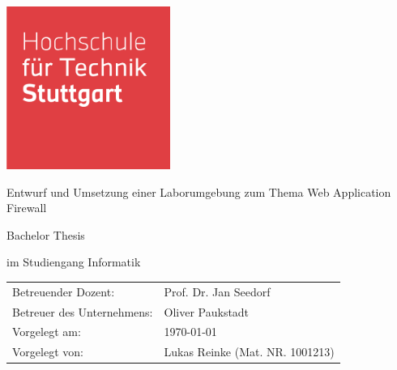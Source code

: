 \begin{titlepage}
    \includegraphics[width=0.4\textwidth]{images/HFT_logo}
    \centering
    \vspace{1.5cm}
    {\par \LARGE Entwurf und Umsetzung einer Laborumgebung zum Thema Web Application Firewall\par}
    \vspace{1cm}
    {\par \large Bachelor Thesis\par}
    {\par \large im Studiengang Informatik\par}
    \vfill
    \begin{table}[!hbt]
        \centering
        \begin{tabular}{ll}
            Betreuender Dozent:         & Prof. Dr. Jan Seedorf           \\
            Betreuer des Unternehmens:  & Oliver Paukstadt                \\
            Vorgelegt am:               & \today                          \\
            Vorgelegt von:              & Lukas Reinke (Mat. NR. 1001213)
        \end{tabular}\label{tab:info}
    \end{table}
\end{titlepage}